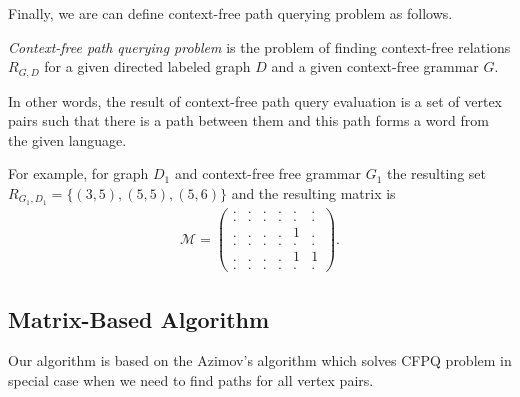 Finally, we are can define context-free path querying problem as follows. 
\begin{definition}
    \emph{Context-free path querying problem} is the problem of finding context-free relations $R_{G, D}$ for a given directed labeled graph $D$ and a given context-free grammar $G$.
    
    In other words, the result of context-free path query evaluation is a set of vertex pairs such that there is a path between them and this path forms a word from the given language.
    
    For example, for graph $D_1$ and context-free free grammar $G_1$ the resulting set $R_{G_1, D_1} = \{(3, 5), (5, 5), (5,6)\}$ and the resulting matrix is 
\begin{align*}
\mathcal{M} =
\begin{pmatrix}
    . & . & . & . & . & .   \\
    . & . & . & . & . & . \\
    . & . & . & . & 1 & .\\
    . & . & . & . & . & . \\ 
    . & . & . & . & 1 & 1 \\ 
    . & . & . & . & . & .
\end{pmatrix}.
\end{align*}
\end{definition} 
 
\subsection{Matrix-Based Algorithm}
Our algorithm is based on the Azimov's algorithm which solves CFPQ problem in special case when we need to find paths for all vertex pairs.

